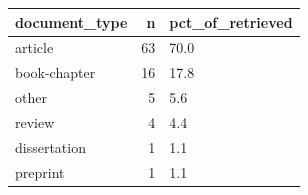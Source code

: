 \begin{tabular}{lrl}
\toprule
document\_type & n & pct\_of\_retrieved \\
\midrule
article & 63 & 70.0 \\
book-chapter & 16 & 17.8 \\
other & 5 & 5.6 \\
review & 4 & 4.4 \\
dissertation & 1 & 1.1 \\
preprint & 1 & 1.1 \\
\bottomrule
\end{tabular}
